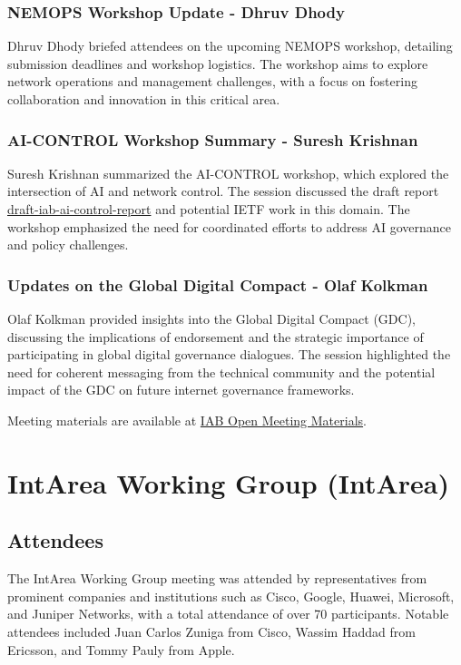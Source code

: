 \documentclass{article}
\begin{document}
\subsubsection{NEMOPS Workshop Update - Dhruv Dhody}

Dhruv Dhody briefed attendees on the upcoming NEMOPS workshop, detailing submission deadlines and workshop logistics. The workshop aims to explore network operations and management challenges, with a focus on fostering collaboration and innovation in this critical area.

\subsubsection{AI-CONTROL Workshop Summary - Suresh Krishnan}

Suresh Krishnan summarized the AI-CONTROL workshop, which explored the intersection of AI and network control. The session discussed the draft report \href{https://datatracker.ietf.org/doc/draft-iab-ai-control-report/}{draft-iab-ai-control-report} and potential IETF work in this domain. The workshop emphasized the need for coordinated efforts to address AI governance and policy challenges.

\subsubsection{Updates on the Global Digital Compact - Olaf Kolkman}

Olaf Kolkman provided insights into the Global Digital Compact (GDC), discussing the implications of endorsement and the strategic importance of participating in global digital governance dialogues. The session highlighted the need for coherent messaging from the technical community and the potential impact of the GDC on future internet governance frameworks.

Meeting materials are available at \href{https://datatracker.ietf.org/meeting/121/materials/slides-121-iabopen-chair-slides-04}{IAB Open Meeting Materials}.



\newpage

\section{IntArea Working Group (IntArea)}

\subsection{Attendees}
The IntArea Working Group meeting was attended by representatives from prominent companies and institutions such as Cisco, Google, Huawei, Microsoft, and Juniper Networks, with a total attendance of over 70 participants. Notable attendees included Juan Carlos Zuniga from Cisco, Wassim Haddad from Ericsson, and Tommy Pauly from Apple.
\end{document}
